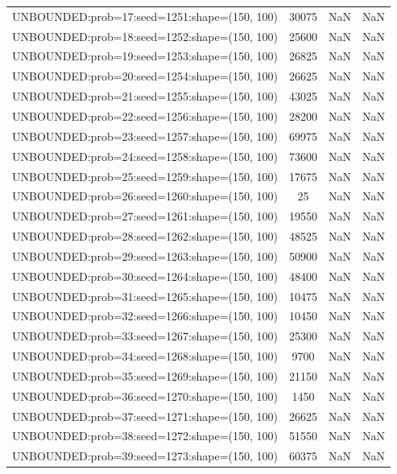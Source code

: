 \begin{longtable}{lccc}
UNBOUNDED:prob=17:seed=1251:shape=(150, 100)  & 30075 &   NaN &    NaN \\
UNBOUNDED:prob=18:seed=1252:shape=(150, 100)  & 25600 &   NaN &    NaN \\
UNBOUNDED:prob=19:seed=1253:shape=(150, 100)  & 26825 &   NaN &    NaN \\
UNBOUNDED:prob=20:seed=1254:shape=(150, 100)  & 26625 &   NaN &    NaN \\
UNBOUNDED:prob=21:seed=1255:shape=(150, 100)  & 43025 &   NaN &    NaN \\
UNBOUNDED:prob=22:seed=1256:shape=(150, 100)  & 28200 &   NaN &    NaN \\
UNBOUNDED:prob=23:seed=1257:shape=(150, 100)  & 69975 &   NaN &    NaN \\
UNBOUNDED:prob=24:seed=1258:shape=(150, 100)  & 73600 &   NaN &    NaN \\
UNBOUNDED:prob=25:seed=1259:shape=(150, 100)  & 17675 &   NaN &    NaN \\
UNBOUNDED:prob=26:seed=1260:shape=(150, 100)  &    25 &   NaN &    NaN \\
UNBOUNDED:prob=27:seed=1261:shape=(150, 100)  & 19550 &   NaN &    NaN \\
UNBOUNDED:prob=28:seed=1262:shape=(150, 100)  & 48525 &   NaN &    NaN \\
UNBOUNDED:prob=29:seed=1263:shape=(150, 100)  & 50900 &   NaN &    NaN \\
UNBOUNDED:prob=30:seed=1264:shape=(150, 100)  & 48400 &   NaN &    NaN \\
UNBOUNDED:prob=31:seed=1265:shape=(150, 100)  & 10475 &   NaN &    NaN \\
UNBOUNDED:prob=32:seed=1266:shape=(150, 100)  & 10450 &   NaN &    NaN \\
UNBOUNDED:prob=33:seed=1267:shape=(150, 100)  & 25300 &   NaN &    NaN \\
UNBOUNDED:prob=34:seed=1268:shape=(150, 100)  &  9700 &   NaN &    NaN \\
UNBOUNDED:prob=35:seed=1269:shape=(150, 100)  & 21150 &   NaN &    NaN \\
UNBOUNDED:prob=36:seed=1270:shape=(150, 100)  &  1450 &   NaN &    NaN \\
UNBOUNDED:prob=37:seed=1271:shape=(150, 100)  & 26625 &   NaN &    NaN \\
UNBOUNDED:prob=38:seed=1272:shape=(150, 100)  & 51550 &   NaN &    NaN \\
UNBOUNDED:prob=39:seed=1273:shape=(150, 100)  & 60375 &   NaN &    NaN \\

\end{longtable}
